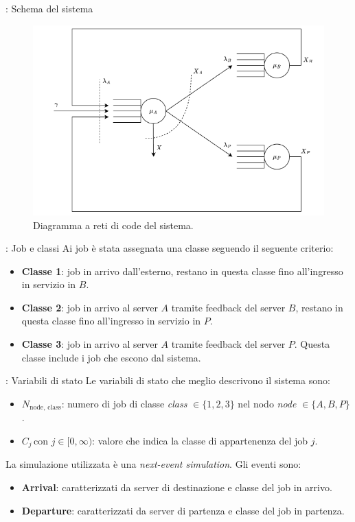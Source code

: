 \begin{frame}{\subsecname: Schema del sistema}
    \begin{figure}
        \centering
        \includegraphics[width=0.75\linewidth]{figs/webapp_conceptual.drawio.png}
        \caption{Diagramma a reti di code del sistema.}
        \label{fig:enter-label}
    \end{figure}
\end{frame}

\begin{frame}{\subsecname: Job e classi}
    Ai job è stata assegnata una classe seguendo il seguente criterio:
    \begin{itemize}
        \item \textbf{Classe 1}: job in arrivo dall'esterno, restano in questa classe fino all'ingresso in servizio in $B$.
        \item \textbf{Classe 2}: job in arrivo al server $A$ tramite feedback del server $B$, restano in questa classe fino all'ingresso in servizio in $P$.
        \item \textbf{Classe 3}: job in arrivo al server $A$ tramite feedback del server $P$. Questa classe include i job che escono dal sistema.
    \end{itemize}
\end{frame}

\begin{frame}{\subsecname: Variabili di stato}
    Le variabili di stato che meglio descrivono il sistema sono:
    \begin{itemize}
        \item $N_{\text{node, class}}$: numero di job di classe \textit{class} $\in \{1,2,3\}$ nel nodo \textit{node} $\in \{A,B,P\}$.
        \item $C_j \, \text{con } j \in [0, \infty)$: valore che indica la classe di appartenenza del job $j$.
    \end{itemize}
    La simulazione utilizzata è una \textit{next-event simulation}. Gli eventi sono:
    \begin{itemize}
        \item \textbf{Arrival}: caratterizzati da server di destinazione e classe del job in arrivo.
        \item \textbf{Departure}: caratterizzati da server di partenza e classe del job in partenza.
    \end{itemize}
\end{frame}

